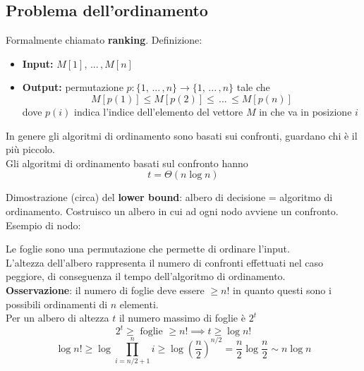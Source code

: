 \documentclass[11pt]{article}
\begin{document}
	
	\newpage
	
	\subsection{Problema dell'ordinamento}
	
	Formalmente chiamato \textbf{ranking}. Definizione:
	\begin{itemize}
		\item \textbf{Input:} $M[1], \, ... \, , M[n]$
		
		\item \textbf{Output:} permutazione $p: \{1, \, ... \, , n\} \rightarrow \{1, \, ... \, , n\}$ tale che
		$$ M[p(1)] \leq M[p(2)] \leq \, ... \, \leq M[p(n)] $$
		dove $p(i)$ indica l'indice dell'elemento del vettore $M$ in che va in posizione $i$
	\end{itemize}
	
	In genere gli algoritmi di ordinamento sono basati sui confronti, guardano chi è il più piccolo.\\
	Gli algoritmi di ordinamento basati sul confronto hanno 
	$$ t = \Theta (n \log n) $$
	
	Dimostrazione (circa) del \textbf{lower bound}: albero di decisione = algoritmo di ordinamento. Costruisco un albero in cui ad ogni nodo avviene un confronto.\\
	Esempio di nodo: 
	\begin{center}
	\end{center}
	
	Le foglie sono una permutazione che permette di ordinare l'input.\\
	L'altezza dell'albero rappresenta il numero di confronti effettuati nel caso peggiore, di conseguenza il tempo dell'algoritmo di ordinamento.\\
	
	\textbf{Osservazione}: il numero di foglie deve essere $\geq n!$ in quanto questi sono i possibili ordinamenti di $n$ elementi.\\
	Per un albero di altezza $t$ il numero massimo di foglie è $2^t$
	$$ 2^t \geq \text{ foglie } \geq n! \implies t \geq \log n! $$
	$$ \log n! \geq \log \prod_{i = n/2 + 1}^n i \geq \log \left(\frac{n}{2}\right)^{n/2} = \frac{n}{2} \log \frac{n}{2} \sim n \log n $$
	
\end{document}
